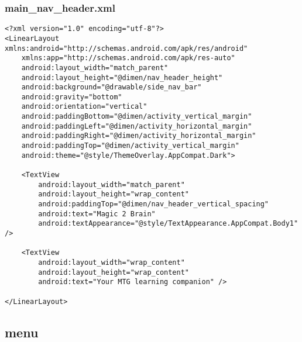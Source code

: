 \subsubsection*{main\_nav\_header.xml}
\begin{lstlisting}
<?xml version="1.0" encoding="utf-8"?>
<LinearLayout xmlns:android="http://schemas.android.com/apk/res/android"
    xmlns:app="http://schemas.android.com/apk/res-auto"
    android:layout_width="match_parent"
    android:layout_height="@dimen/nav_header_height"
    android:background="@drawable/side_nav_bar"
    android:gravity="bottom"
    android:orientation="vertical"
    android:paddingBottom="@dimen/activity_vertical_margin"
    android:paddingLeft="@dimen/activity_horizontal_margin"
    android:paddingRight="@dimen/activity_horizontal_margin"
    android:paddingTop="@dimen/activity_vertical_margin"
    android:theme="@style/ThemeOverlay.AppCompat.Dark">

    <TextView
        android:layout_width="match_parent"
        android:layout_height="wrap_content"
        android:paddingTop="@dimen/nav_header_vertical_spacing"
        android:text="Magic 2 Brain"
        android:textAppearance="@style/TextAppearance.AppCompat.Body1" />

    <TextView
        android:layout_width="wrap_content"
        android:layout_height="wrap_content"
        android:text="Your MTG learning companion" />

</LinearLayout>
\end{lstlisting}

\subsection*{menu}
